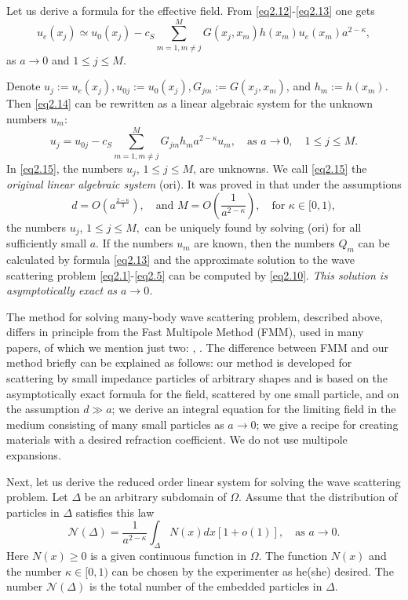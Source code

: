\documentclass[12pt]{elsarticle}
\numberwithin{equation}{section}
\newcommand{\be}{\begin{equation}}
\newcommand{\ee}{\end{equation}}
\begin{document}
Let us derive a formula for the effective field. From \eqref{eq2.12}-\eqref{eq2.13} one gets
\be \label{eq2.14}
    u_e(x_j) \simeq u_0(x_j)-c_S\sum_{m=1, m \neq j}^M G(x_j,x_m)h(x_m)u_e(x_m)a^{2-\kappa},
\ee
as $a \to 0$ and $1 \leq j \leq M$.

Denote $u_j:=u_e(x_j),  u_{0j}:=u_0(x_j), G_{jm}:=G(x_j,x_m)$, and $h_m:=h(x_m)$. Then \eqref{eq2.14} can be rewritten as
a linear algebraic system for the unknown numbers $u_m$:
\be \label{eq2.15}
    u_j = u_{0j}-c_S\sum_{m=1, m \neq j}^M G_{jm} h_m a^{2-\kappa} u_m, \quad\text{as } a \to 0, \quad 1 \leq j \leq M.
\ee
In \eqref{eq2.15}, the numbers $u_j$, $1 \le j \le M$, are unknowns. We call \eqref{eq2.15} the  \textit{original linear algebraic system} (ori). It was proved in \citet{R635} that under the assumptions
\be \label{eq2.16}
    d=O\left(a^{\frac{2-\kappa}{3}}\right), \quad\text{and } M=O\left(\frac{1}{a^{2-\kappa}}\right), \quad\text{for } \kappa \in [0,1),
\ee
the numbers $u_j$, $1 \leq j \leq M,$ can be uniquely found by solving (ori) for all sufficiently small $a$. If the numbers $u_m$ are known,
then the numbers $Q_m$ can be calculated by formula \eqref{eq2.13} and the approximate solution to the wave scattering problem \eqref{eq2.1}-\eqref{eq2.5} can be computed by \eqref{eq2.10}. {\em This solution is asymptotically exact as $a \to 0$.}

The method for solving many-body wave scattering problem, described above, differs in principle from the
Fast Multipole Method (FMM), used in many papers, of which we mention just two: \cite{GR1987}, \cite{GR1997}.
The difference between FMM and our method briefly can be explained as follows: our method is developed
for scattering by small impedance particles of arbitrary shapes and is based on the asymptotically exact
formula for the field, scattered by one small particle, and on the assumption $d \gg a$; we derive
an integral equation for the limiting field in the medium consisting of many small particles as $a\to 0$;
we give a recipe for creating materials with a desired refraction coefficient.
We do not use multipole expansions.

Next, let us derive the reduced order linear system for solving the wave scattering problem. Let $\Delta$ be an arbitrary subdomain of $\Omega$. Assume that the distribution of particles in $\Delta$ satisfies this law
\be \label{eq2.17}
    \mathcal{N}(\Delta)=\frac{1}{a^{2-\kappa}} \int_{\Delta} N(x)dx[1+o(1)], \quad\text{as } a \to 0.
\ee
Here $N(x) \ge 0$ is a given continuous function in $\Omega$. The function  $N(x)$ and the number $\kappa\in [0,1)$ can be chosen
by the experimenter as he(she) desired. The number $\mathcal{N}(\Delta)$ is the total number of the embedded particles in $\Delta$.
\end{document}
